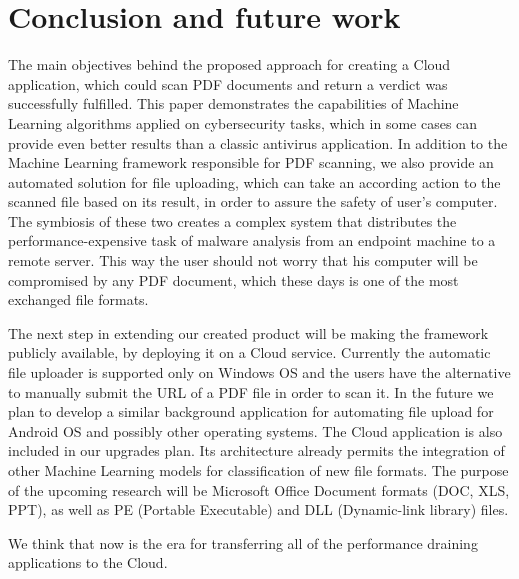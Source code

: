 \chapter{Conclusion and future work}
\label{chapter:conclusion}

The main objectives behind the proposed approach for creating a Cloud application, which could scan PDF documents and return a verdict was successfully fulfilled. This paper demonstrates the capabilities of Machine Learning algorithms applied on cybersecurity tasks, which in some cases can provide even better results than a classic antivirus application. In addition to the Machine Learning framework responsible for PDF scanning, we also provide an automated solution for file uploading, which can take an according action to the scanned file based on its result, in order to assure the safety of user's computer. The symbiosis of these two creates a complex system that distributes the performance-expensive task of malware analysis from an endpoint machine to a remote server. This way the user should not worry that his computer will be compromised by any PDF document, which these days is one of the most exchanged file formats. \par 
The next step in extending our created product will be making the framework publicly available, by deploying it on a Cloud service. Currently the automatic file uploader is supported only on Windows OS and the users have the alternative to manually submit the URL of a PDF file in order to scan it. In the future we plan to develop a similar background application for automating file upload for Android OS and possibly other operating systems. The Cloud application is also included in our upgrades plan. Its architecture already permits the integration of other Machine Learning models for classification of new file formats. The purpose of the upcoming research will be Microsoft Office Document formats (DOC, XLS, PPT), as well as PE (Portable Executable) and DLL (Dynamic-link library) files. \par
We think that now is the era for transferring all of the performance draining applications to the Cloud.